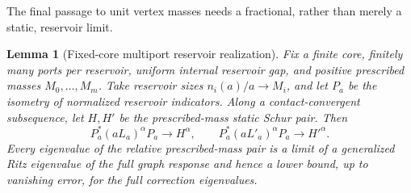 \documentclass[11pt]{article}
\newtheorem{lemma}[theorem]{Lemma}
\begin{document}
The final passage to unit vertex masses needs a fractional, rather
than merely a static, reservoir limit.
\begin{lemma}[Fixed-core multiport reservoir realization]\label{lem:reservoir}
Fix a finite core, finitely many ports per reservoir, uniform internal
reservoir gap, and positive prescribed masses $M_0,\ldots,M_m$.
Take reservoir sizes $n_i(a)/a\to M_i$, and let $P_a$ be the isometry
of normalized reservoir indicators. Along a contact-convergent
subsequence, let $H,H'$ be the prescribed-mass static Schur pair. Then
\[
 P_a^*(aL_a)^\alpha P_a\longrightarrow H^\alpha,\qquad
 P_a^*(aL'_a)^\alpha P_a\longrightarrow {H'}^\alpha.
\]
Every eigenvalue of the relative prescribed-mass pair is a limit of a
generalized Ritz eigenvalue of the full graph response and hence a
lower bound, up to vanishing error, for the full correction eigenvalues.
\end{lemma}
\end{document}
